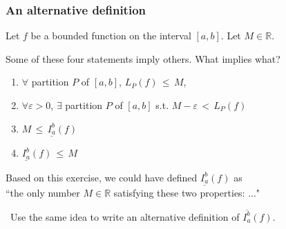 \documentclass[14pt]{beamer}
\newcommand{\R}{\mathbb{R}}
\newcommand{\e}{\varepsilon}
\newcommand{\p}{\pause}
\newcommand{\setsize}[1]{\fontsize{#1}{#1}\selectfont} %
\newcommand{\smallerfont}{\setsize{13}} %
\newcommand{\lifab}{\underline{I_a^b}(f)}
\newcommand{\uifab}{\overline{I_a^b}(f)}
\begin{document}
	\begin{frame}[t]
		\smallerfont
		\frametitle{An alternative definition}

		Let $f$ be a bounded function on the interval $[a,b]$. Let $M \in \R$.

		Some of these four statements imply others. What implies what?
		\vspace{.2cm}
		\begin{enumerate}
			\item $\forall$ partition $P$ of $[a,b]$, \;
				${\displaystyle L_P(f) \,\leq\, M}$,
				\vspace{.2cm}

			\item $\forall \e>0$, $\exists$ partition $P$ of $[a,b]$ \; s.t. \; ${\displaystyle M - \e \,< \, L_P(f)}$
				\vspace{.2cm}

			\item ${\displaystyle M \, \leq \, \lifab}$

			\item ${\displaystyle \lifab \, \leq \, M}$
		\end{enumerate}

		\p
		\vfill

		Based on this exercise, we could have defined $\lifab$ as \\``the only number
		$M \in \R$ satisfying these two properties: ..."

		\
 Use the same idea to write an alternative definition of $\uifab$.

		\vfill
	\end{frame}
\end{document}
